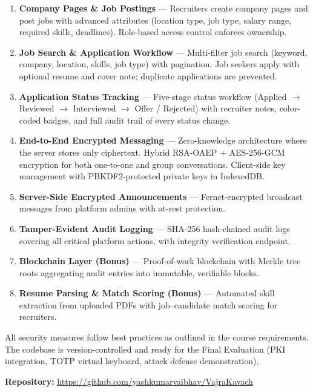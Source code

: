 \documentclass[12pt,a4paper]{article}
\begin{document}
\begin{enumerate}
  \item \textbf{Company Pages \& Job Postings} --- Recruiters create company pages and post jobs with advanced attributes (location type, job type, salary range, required skills, deadlines). Role-based access control enforces ownership.

  \item \textbf{Job Search \& Application Workflow} --- Multi-filter job search (keyword, company, location, skills, job type) with pagination. Job seekers apply with optional resume and cover note; duplicate applications are prevented.

  \item \textbf{Application Status Tracking} --- Five-stage status workflow (Applied $\rightarrow$ Reviewed $\rightarrow$ Interviewed $\rightarrow$ Offer / Rejected) with recruiter notes, color-coded badges, and full audit trail of every status change.

  \item \textbf{End-to-End Encrypted Messaging} --- Zero-knowledge architecture where the server stores only ciphertext. Hybrid RSA-OAEP + AES-256-GCM encryption for both one-to-one and group conversations. Client-side key management with PBKDF2-protected private keys in IndexedDB.

  \item \textbf{Server-Side Encrypted Announcements} --- Fernet-encrypted broadcast messages from platform admins with at-rest protection.

  \item \textbf{Tamper-Evident Audit Logging} --- SHA-256 hash-chained audit logs covering all critical platform actions, with integrity verification endpoint.

  \item \textbf{Blockchain Layer (Bonus)} --- Proof-of-work blockchain with Merkle tree roots aggregating audit entries into immutable, verifiable blocks.

  \item \textbf{Resume Parsing \& Match Scoring (Bonus)} --- Automated skill extraction from uploaded PDFs with job--candidate match scoring for recruiters.
\end{enumerate}

\vspace{0.5cm}
\noindent All security measures follow best practices as outlined in the course requirements. The codebase is version-controlled and ready for the Final Evaluation (PKI integration, TOTP virtual keyboard, attack defense demonstration).

\vspace{1cm}
\noindent\textbf{Repository:} \url{https://github.com/yashkumarvaibhav/VajraKavach}
\end{document}
